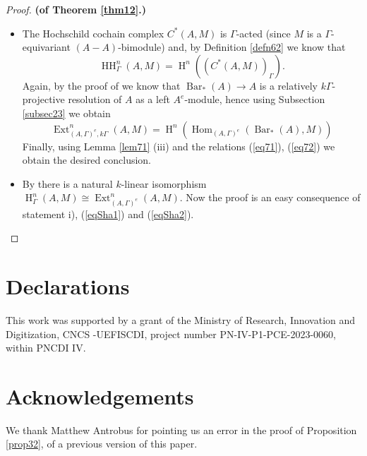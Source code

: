 \documentclass[pdflatex,sn-mathphys-num]{sn-jnl}
\numberwithin{equation}{section}
\theoremstyle{thmstyleone}
\theoremstyle{thmstyletwo}
\theoremstyle{thmstylethree}
\newcommand{\Ext}{\operatorname{Ext}}
\newcommand{\Barc}{\operatorname{Bar}}
\newcommand{\Hom}{\operatorname{Hom}}
\newcommand{\Hrm}{\operatorname{H}}
\newcommand{\HH}{\operatorname{HH}}
\begin{document}
\begin{proof}\textbf{(of Theorem \ref{thm12}.)}
\begin{itemize}
\item[i)] The Hochschild cochain complex $C^*(A,M)$ is $\Gamma$-acted (since $M$ is a $\Gamma$-equivariant $(A-A)$-bimodule) and, by Definition \ref{defn62} we know that
\begin{equation} \label{eq71}
\HH_{\Gamma}^n(A,M)=\Hrm^n((C^*(A,M))_{\Gamma}).
\end{equation}
Again, by the proof of \cite[Theorem 7.6 (3)]{In} we know that $\Barc_*(A)\rightarrow A$ is a relatively $k\Gamma$-projective resolution of $A$ as a left $A^e$-module, hence using Subsection \ref{subsec23} we obtain
\begin{equation}\label{eq72}
\Ext_{(A,\Gamma)^e,k\Gamma}^n (A,M)=\Hrm^n(\Hom_{(A,\Gamma)^e}(\Barc_*(A),M))
\end{equation}
Finally, using Lemma \ref{lem71} (iii) and the relations (\ref{eq71}), (\ref{eq72}) we obtain the desired conclusion.
\item[ii)] By \cite[Theorem 6.1]{KoPi} there is a natural $k$-linear isomorphism $\Hrm_{\Gamma}^n(A,M)\cong \Ext_{(A,\Gamma)^e}^n (A,M).$ Now the proof is an easy consequence of statement i), (\ref{eqSha1}) and (\ref{eqSha2}).
\end{itemize}
\end{proof}

\backmatter
\section*{Declarations}
This work was supported by a grant of the Ministry of Research, Innovation and Digitization, CNCS -UEFISCDI, project number PN-IV-P1-PCE-2023-0060, within PNCDI IV.\\

\section*{Acknowledgements}
We thank Matthew Antrobus  for pointing us an error in the proof of Proposition \ref{prop32}, of a previous version of this paper.



\end{document}
